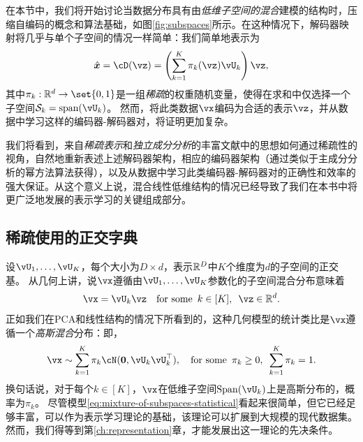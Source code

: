 \documentclass[../../book-main.tex]{subfiles}
\begin{document}
在本节中，我们将开始讨论当数据分布具有由\textit{低维子空间的混合}建模的结构时，压缩自编码的概念和算法基础，如图\ref{fig:subspaces}所示。在这种情况下，解码器映射将几乎与单个子空间的情况一样简单：我们简单地表示为
\begin{equation}\label{eq:mixture-subspaces-decoder-first-cut}
    \hat{\x} = \cD(\vz) = \left( \sum_{k=1}^K \pi_k(\vz)\vU_k \right) \vz,
\end{equation}
其中$\pi_k : \R^d \to \set{0,1}$是一组\textit{稀疏}的权重随机变量，使得在求和中仅选择一个子空间$\mathcal{S}_k = \mbox{span}(\vU_k)$。
然而，将此类数据$\vx$编码为合适的表示$\vz$，并从数据中学习这样的编码器-解码器对，将证明更加复杂。

我们将看到，来自\textit{稀疏表示}和\textit{独立成分分析}的丰富文献中的思想如何通过稀疏性的视角，自然地重新表述上述解码器架构，相应的编码器架构（通过类似于主成分分析的幂方法算法获得），以及从数据中学习此类编码器-解码器对的正确性和效率的强大保证。从这个意义上说，混合线性低维结构的情况已经导致了我们在本书中将更广泛地发展的表示学习的关键组成部分。

\subsection{稀疏使用的正交字典}


设$\vU_1, \dots, \vU_K$，每个大小为$D \times d$，表示$\mathbb{R}^D$中$K$个维度为$d$的子空间的正交基。
从几何上讲，说$\vx$遵循由$\vU_1, \dots, \vU_K$参数化的子空间混合分布意味着
\begin{equation}\label{eq:mixture-of-subspaces-geometric}
    \vx = \vU_k \vz  \quad \text{for some} \enspace k \in [K],\enspace \vz \in \R^d.
\end{equation}
正如我们在PCA和线性结构的情况下所看到的，这种几何模型的统计类比是$\vx$遵循一个\textit{高斯混合}分布：即，
\begin{equation}\label{eq:mixture-of-subspaces-statistical}
    \vx \sim \sum_{k=1}^K \pi_k \cN(\mathbf{0}, \vU_k\vU_k^\top), \quad \text{for some} \enspace \pi_k \geq 0,\enspace \sum_{k=1}^K \pi_k = 1.
\end{equation}
换句话说，对于每个$k \in [K]$，$\vx$在低维子空间$\Span(\vU_k)$上是高斯分布的，概率为$\pi_k$。
尽管模型\eqref{eq:mixture-of-subspaces-statistical}看起来很简单，但它已经足够丰富，可以作为表示学习理论的基础，该理论可以扩展到大规模的现代数据集。
然而，我们得等到第\ref{ch:representation}章，才能发展出这一理论的先决条件。
\end{document}
